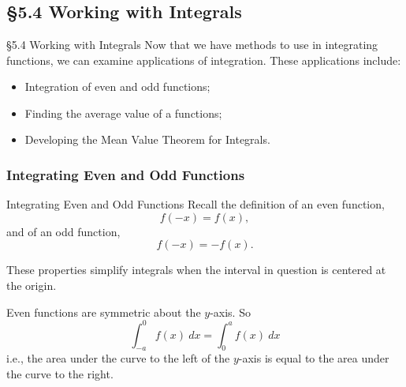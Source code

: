 \documentclass[cal1spr16Lectures.tex]{subfiles}
\begin{document}
\section[]{}

\subsection[5.4 Working with Integrals]{\S 5.4 Working with Integrals}

\begin{frame}{\S 5.4 Working with Integrals}
Now that we have methods to use in integrating functions, we can examine applications of integration.  These applications include:
\begin{itemize}
\item Integration of even and odd functions;
\item Finding the average value of a functions;
\item Developing the Mean Value Theorem for Integrals.
\end{itemize}
\end{frame}

\subsubsection{Integrating Even and Odd Functions}
\begin{frame}{\small Integrating Even and Odd Functions}\small
Recall the definition of an even function,
\[f(-x)=f(x),\] 
and of an odd function, 
\[f(-x)=-f(x).\]

These properties simplify integrals when the interval in question is centered at the origin.
\end{frame}
%

\begin{frame}%
Even functions are symmetric about the $y$-axis.  So 
%
\[
\int_{-a}^0 f(x)\ dx = \int_0^a f(x)\ dx
\]
%
i.e., the area under the curve to the left of the $y$-axis is equal to the area under the curve to the right.
\end{frame}
\end{document}
